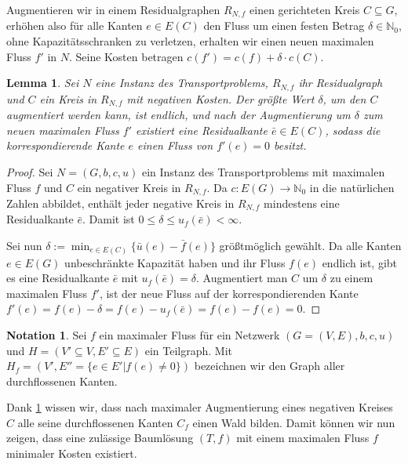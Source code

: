 \documentclass[a4paper,twoside,ngerman]{report}
\theoremstyle{plain}
\newtheorem{lem}[thm]{Lemma}
\theoremstyle{definition}
\newtheorem*{nota}{Notation}
\begin{document}
Augmentieren wir in einem Residualgraphen $R_{N,f}$ einen gerichteten Kreis $C\subseteq G$, erhöhen also für alle Kanten $e\in E(C)$ den Fluss um einen festen Betrag $\delta\in\mathbb{N}_0$, ohne Kapazitätsschranken zu verletzen, erhalten wir einen neuen maximalen Fluss $f'$ in $N$. Seine Kosten betragen $c(f')=c(f) + \delta\cdot c(C)$.

\begin{lem}\label{negKreis}Sei $N$ eine Instanz des Transportproblems, $R_{N,f}$ ihr Residualgraph und $C$ ein Kreis in $R_{N,f}$ mit negativen Kosten. Der größte Wert $\delta$, um den $C$ augmentiert werden kann, ist endlich, und nach der Augmentierung um $\delta$ zum neuen maximalen Fluss $f'$ existiert eine Residualkante $\bar{e}\in E(C)$, sodass die korrespondierende Kante $e$ einen Fluss von $f'(e)=0$ besitzt. 
\end{lem}
\begin{proof}Sei $N=(G,b,c,u)$ ein Instanz des Transportproblems mit maximalen Fluss $f$ und $C$ ein negativer Kreis in $R_{N,f}$. Da $c:E(G)\rightarrow\mathbb{N}_0$ in die natürlichen Zahlen abbildet, enthält jeder negative Kreis in $R_{N,f}$ mindestens eine Residualkante $\bar{e}$. Damit ist $0\leq\delta\leq u_f(\bar{e})<\infty$.

Sei nun $\delta:=\min_{e\in E(C)}\{\bar{u}(e)-\bar{f}(e)\}$ größtmöglich gewählt. Da alle Kanten $e\in E(G)$ unbeschränkte Kapazität haben und ihr Fluss $f(e)$ endlich ist, gibt es eine Residualkante $\bar{e}$ mit $u_f(\bar{e})=\delta$. Augmentiert man $C$ um $\delta$ zu einem maximalen Fluss $f'$, ist der neue Fluss auf der korrespondierenden Kante $f'(e)=f(e)-\delta=f(e)-u_f(\bar{e})=f(e)-f(e)=0$.\end{proof}

\begin{nota}Sei $f$ ein maximaler Fluss für ein Netzwerk $(G=(V,E),b,c,u)$ und $H=(V'\subseteq V, E'\subseteq E)$ ein Teilgraph. Mit $H_f=(V',E''=\{e\in E' | f(e) \neq 0\})$ bezeichnen wir den Graph aller durchflossenen Kanten.\end{nota}

Dank \cref{negKreis} wissen wir, dass nach maximaler Augmentierung eines negativen Kreises $C$ alle seine durchflossenen Kanten $C_f$ einen Wald bilden. Damit können wir nun zeigen, dass eine zulässige Baumlösung $(T,f)$ mit einem maximalen Fluss $f$ minimaler Kosten existiert.
\end{document}
